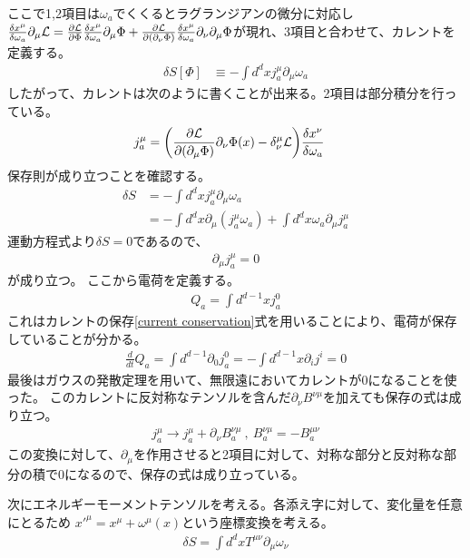 \documentclass[11pt, dvipdfmx]{article}
\numberwithin{equation}{section}
\newcommand{\blankline}{\par\vspace{\baselineskip}} %
\begin{document}
 ここで1,2項目は$\omega_a$でくくるとラグランジアンの微分に対応し$\frac{\delta x^\mu}{\delta \omega_a}\partial_\mu\mathcal{L}=\pdv{\mathcal{L}}{\Phi}\frac{\delta x^\mu}{\delta \omega_a }\partial_\mu\Phi+\pdv{\mathcal{L}}{(\partial_\nu \Phi)}\frac{\delta x^\mu}{\delta \omega_a}\partial_\nu\partial_\mu \Phi$が現れ、3項目と合わせて、カレントを定義する。
\begin{align}
    \delta S[\Phi] &\equiv-\int d^dx j_a^\mu \partial_\mu \omega_a 
\end{align}
したがって、カレントは次のように書くことが出来る。2項目は部分積分を行っている。
\begin{align}
    j_a^\mu &= \qty(\pdv{\mathcal{L}}{(\partial_\mu\Phi)}\partial_\nu \Phi(x)-\delta^\mu_\nu \mathcal{L})\frac{\delta x^\nu}{\delta\omega_a}
\end{align}
保存則が成り立つことを確認する。
\begin{align}
    \delta S &=-\int d^dx j_a^\mu \partial_\mu \omega_a\\
    &=-\int d^dx \partial_\mu (j_a^\mu \omega_a) + \int d^dx \omega_a \partial_\mu j_a^\mu  
\end{align}
運動方程式より$\delta S=0$であるので、
\begin{align}
    \partial_\mu j^\mu_a=0\label{current conservation}
\end{align}
が成り立つ。
ここから電荷を定義する。
\begin{align}
    Q_a=\int d^{d-1}x j^0_a
\end{align}
これはカレントの保存\eqref{current conservation}式を用いることにより、電荷が保存していることが分かる。
\begin{align}
    \frac{d}{d t}Q_a=\int d^{d-1}\partial_0j_a^0=-\int d^{d-1}x \partial_i j^i=0 
\end{align}
最後はガウスの発散定理を用いて、無限遠においてカレントが0になることを使った。
このカレントに反対称なテンソルを含んだ$\partial_\nu B^{\nu\mu}$を加えても保存の式は成り立つ。
\begin{align}
    j_a^\mu \rightarrow j_a^\mu +\partial_\nu B_a^{\nu\mu}\ ,\ B_a^{\nu\mu}=-B_a^{\mu\nu} 
\end{align}
この変換に対して、$\partial_\mu$を作用させると2項目に対して、対称な部分と反対称な部分の積で0になるので、保存の式は成り立っている。
\blankline
次にエネルギーモーメントテンソルを考える。各添え字に対して、変化量を任意にとるため
$x'^\mu=x^\mu +\omega^\mu(x)$という座標変換を考える。
\begin{align}
    \delta S=\int d^dxT^{\mu\nu}\partial_\mu \omega_\nu
\end{align}
\end{document}
